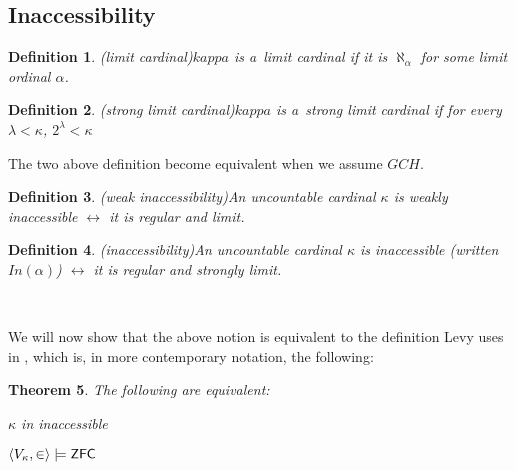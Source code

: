 \documentclass[12pt,a4paper]{article}
\newtheorem{theorem}{Theorem}[section]
\newtheorem{definition}[theorem]{Definition}
\renewcommand{\iff}{\leftrightarrow}
\newcommand{\sub}{\subseteq}
\newcommand{\bce}{\begin{compactenum}}
\newcommand{\ece}{\end{compactenum}}
\begin{document}



\subsection{Inaccessibility}\label{section:inaccessibility}
\begin{definition}(limit cardinal)\label{def:limit}
$kappa$ is a~\emph{limit cardinal} if it is $\aleph_\alpha$ for some limit ordinal $\alpha$.
\end{definition}

\begin{definition}(strong limit cardinal)\label{def:strong_limit}
$kappa$ is a~\emph{strong limit cardinal} if for every $\lambda < \kappa$, $2^\lambda < \kappa$
\end{definition}

The two above definition become equivalent when we assume $GCH$.


\begin{definition}(weak inaccessibility)\label{def:weakly_inaccessible}
An uncountable cardinal $\kappa$ is \emph{weakly inaccessible} $\iff$ it is \emph{regular} and \emph{limit}.
\end{definition}
\begin{definition}(inaccessibility)\label{def:inaccessible}
An uncountable cardinal $\kappa$ is \emph{inaccessible} (written $In(\alpha)$) $\iff$ it is \emph{regular} and \emph{strongly limit}.
\end{definition}

\

We will now show that the above notion is equivalent to the definition Levy uses in \cite{Levy60a}, which is, in more contemporary notation, the following:
\begin{theorem}\label{theorem:inaccessible_models_zfc}
The following are equivalent:
\bce
\item $\kappa$ in inaccessible
\item $\langle V_\kappa, \in \rangle \models \sf{ZFC}$
\ece
\end{theorem}
\end{document}
